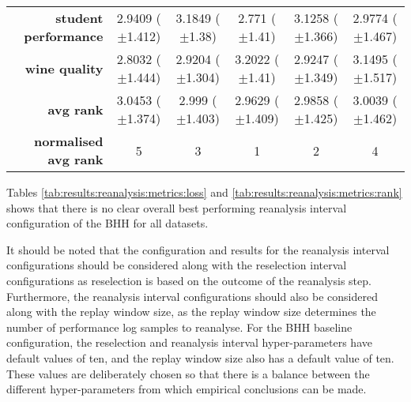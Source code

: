 \begin{table}[htb]
{\begin{tabular}{r|ccccc}
			\textbf{student performance} & \cellcolor[rgb]{ .89,  .89,  .51}2.9409 ($\pm$1.412)    & \cellcolor[rgb]{ .973,  .412,  .42}3.1849 ($\pm$1.38)   & \cellcolor[rgb]{ .388,  .745,  .482}2.771 ($\pm$1.41)   & \cellcolor[rgb]{ .98,  .561,  .451}3.1258 ($\pm$1.366)  & \cellcolor[rgb]{ 1,  .922,  .518}2.9774 ($\pm$1.467)    \\
			\textbf{wine quality}        & \cellcolor[rgb]{ .388,  .745,  .482}2.8032 ($\pm$1.444) & \cellcolor[rgb]{ .976,  .914,  .514}2.9204 ($\pm$1.304) & \cellcolor[rgb]{ .973,  .412,  .42}3.2022 ($\pm$1.41)   & \cellcolor[rgb]{ 1,  .922,  .518}2.9247 ($\pm$1.349)    & \cellcolor[rgb]{ .98,  .51,  .439}3.1495 ($\pm$1.517)   \\
			\midrule
			\textbf{avg rank}            & \cellcolor[rgb]{ .973,  .412,  .42}3.0453 ($\pm$1.374)  & \cellcolor[rgb]{ 1,  .922,  .518}2.999 ($\pm$1.403)     & \cellcolor[rgb]{ .388,  .745,  .482}2.9629 ($\pm$1.409) & \cellcolor[rgb]{ .773,  .855,  .502}2.9858 ($\pm$1.425) & \cellcolor[rgb]{ 1,  .871,  .51}3.0039 ($\pm$1.462)     \\
			\midrule
			\textbf{normalised avg rank} & \cellcolor[rgb]{ .973,  .412,  .42}5                    & \cellcolor[rgb]{ 1,  .922,  .518}3                      & \cellcolor[rgb]{ .388,  .745,  .482}1                   & \cellcolor[rgb]{ .694,  .831,  .498}2                   & \cellcolor[rgb]{ .988,  .667,  .471}4                   \\
		\end{tabular}%
	}
\end{table}%


Tables \ref{tab:results:reanalysis:metrics:loss} and \ref{tab:results:reanalysis:metrics:rank} shows that there is no clear overall best performing reanalysis interval configuration of the \acs{BHH} for all datasets.

It should be noted that the configuration and results for the reanalysis interval configurations should be considered along with the reselection interval configurations as reselection is based on the outcome of the reanalysis step. Furthermore, the reanalysis interval configurations should also be considered along with the replay window size, as the replay window size determines the number of performance log samples to reanalyse. For the \acs{BHH} baseline configuration, the reselection and reanalysis interval hyper-parameters have default values of ten, and the replay window size also has a default value of ten. These values are deliberately chosen so that there is a balance between the different hyper-parameters from which empirical conclusions can be made.

